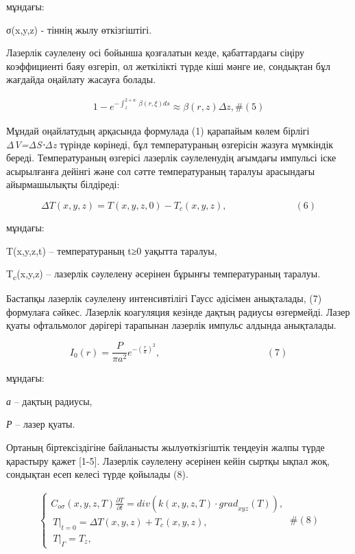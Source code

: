 \begin{multicols}{2}
мұндағы:

σ(x,y,z) - тіннің жылу өткізгіштігі.

Лазерлік сәулелену осі бойынша қозғалатын кезде, қабаттардағы сіңіру
коэффициенті баяу өзгеріп, ол жеткілікті түрде кіші мәнге ие, сондықтан
бұл жағдайда оңайлату жасауға болады.

\[\begin{array}{r}
1 - e^{- \int_{z}^{2 + a}\mspace{2mu}\mspace{2mu}\beta(r,\xi)ds} \approx \beta(r,z)\Delta z,\#(5)
\end{array}\]

Мұндай оңайлатудың арқасында формулада (1) қарапайым көлем бірлігі
\emph{ΔV=ΔS⋅Δz} түрінде көрінеді, бұл температураның өзгерісін жазуға
мүмкіндік береді. Температураның өзгерісі лазерлік сәулеленудің ағымдағы
импульсі іске асырылғанға дейінгі және сол сәтте температураның таралуы
арасындағы айырмашылықты білдіреді:

\[\Delta T(x,y,z) = T(x,y,z,0) - T_{c}(x,y,z),\ \ \ \ \ \ \ \ \ \ \ \ \ \ \ \ \ \ \ \ \ \ \ \ \ \ \ \ \ \ \ \ (6)\]

мұндағы:

T(x,y,z,t) -- температураның t≥0 уақытта таралуы,

T\textsubscript{c}(x,y,z) -- лазерлік сәулелену әсерінен бұрынғы
температураның таралуы.

Бастапқы лазерлік сәулелену интенсивтілігі Гаусс әдісімен анықталады,
(7) формулаға сәйкес. Лазерлік коагуляция кезінде дақтың радиусы
өзгермейді. Лазер қуаты офтальмолог дәрігері тарапынан лазерлік импульс
алдында анықталады.

\[I_{0}(r) = \frac{P}{\pi a^{2}}e^{- \left( \frac{r}{a} \right)^{2}},\ \ \ \ \ \ \ \ \ \ \ \ \ \ \ \ \ \ \ \ \ \ \ \ \ \ \ \ \ \ \ \ \ \ \ \ \ \ \ \ \ \ \ \ \ \ \ \ \ \ (7)\]

мұндағы:

\emph{а} -- дақтың радиусы,

\emph{Р} -- лазер қуаты.

Ортаның біртексіздігіне байланысты жылуөткізгіштік теңдеуін жалпы түрде
қарастыру қажет {[}1-5{]}. Лазерлік сәулелену әсерінен кейін сыртқы
ықпал жоқ, сондықтан есеп келесі түрде қойылады (8).

\[\begin{array}{r}
\left\{ \begin{matrix}
C_{o\sigma}(x,y,z,T)\frac{\partial T}{\partial t} = div\left( k(x,y,z,T) \cdot {grad}_{xyz}(T) \right), \\
\left. \ T \right|_{t = 0} = \Delta T(x,y,z) + T_{c}(x,y,z), \\
\left. \ T \right|_{\Gamma} = T_{z},
\end{matrix} \right.\ \#(8)
\end{array}\]


\end{multicols}
